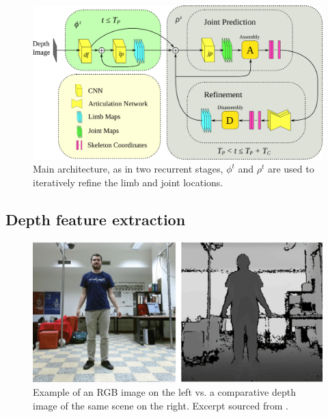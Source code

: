 \begin{figure}[h]
  \centering
  \includegraphics[width=\textwidth]{img/architecture_main}
  \caption[Main architecture]{Main architecture, as in \cite{cao2017realtime} two recurrent stages, $\phi^{t}$ and $\rho^{t}$ are used to iteratively refine the limb and joint locations.}
  \label{fig:arch_main}
\end{figure}

\subsection{Depth feature extraction}\label{subsec:depth_feature}

\begin{figure}[h]
  \centering
  \includegraphics[width=.9\textwidth]{img/rgbd_example}
  \caption[RGB-D Example]{Example of an RGB image on the left vs. a comparative depth image of the same scene on the right. Excerpt sourced from \cite{phdthesisMaxime}.}
  \label{fig:rgbdex}
\end{figure}

